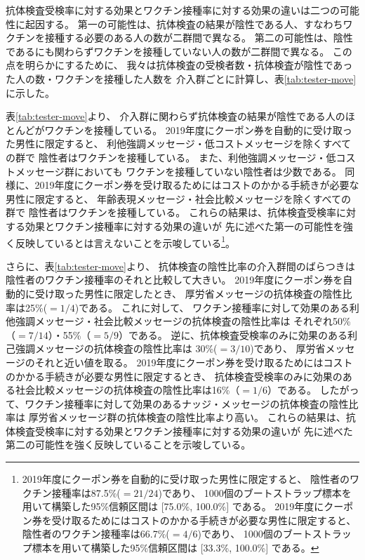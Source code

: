 \documentclass[
  11pt,
  a4paper,
]{article}
\begin{document}
抗体検査受検率に対する効果とワクチン接種率に対する効果の違いは二つの可能性に起因する。
第一の可能性は、抗体検査の結果が陰性である人、すなわちワクチンを接種する必要のある人の数が二群間で異なる。
第二の可能性は、陰性であるにも関わらずワクチンを接種していない人の数が二群間で異なる。
この点を明らかにするために、
我々は抗体検査の受検者数・抗体検査が陰性であった人の数・ワクチンを接種した人数を
介入群ごとに計算し、表\ref{tab:tester-move}に示した。

表\ref{tab:tester-move}より、
介入群に関わらず抗体検査の結果が陰性である人のほとんどがワクチンを接種している。
2019年度にクーポン券を自動的に受け取った男性に限定すると、
利他強調メッセージ・低コストメッセージを除くすべての群で
陰性者はワクチンを接種している。
また、利他強調メッセージ・低コストメッセージ群においても
ワクチンを接種していない陰性者は少数である。
同様に、2019年度にクーポン券を受け取るためにはコストのかかる手続きが必要な男性に限定すると、
年齢表現メッセージ・社会比較メッセージを除くすべての群で
陰性者はワクチンを接種している。
これらの結果は、抗体検査受検率に対する効果とワクチン接種率に対する効果の違いが
先に述べた第一の可能性を強く反映しているとは言えないことを示唆している\footnote{2019年度にクーポン券を自動的に受け取った男性に限定すると、
  陰性者のワクチン接種率は87.5\%(\(=21/24\))であり、
  1000個のブートストラップ標本を用いて構築した95\%信頼区間は
  {[}75.0\%, 100.0\%{]}
  である。
  2019年度にクーポン券を受け取るためにはコストのかかる手続きが必要な男性に限定すると、
  陰性者のワクチン接種率は66.7\%(\(=4/6\))であり、
  1000個のブートストラップ標本を用いて構築した95\%信頼区間は
  {[}33.3\%, 100.0\%{]}
  である。}。

さらに、表\ref{tab:tester-move}より、
抗体検査の陰性比率の介入群間のばらつきは陰性者のワクチン接種率のそれと比較して大きい。
2019年度にクーポン券を自動的に受け取った男性に限定したとき、
厚労省メッセージの抗体検査の陰性比率は25\%(\(=1/4\))である。
これに対して、
ワクチン接種率に対して効果のある利他強調メッセージ・社会比較メッセージの抗体検査の陰性比率は
それぞれ50\%（\(=7/14\)）・55\%（\(=5/9\)）である。
逆に、抗体検査受検率のみに効果のある利己強調メッセージの抗体検査の陰性比率は
30\%(\(=3/10\))であり、
厚労省メッセージのそれと近い値を取る。
2019年度にクーポン券を受け取るためにはコストのかかる手続きが必要な男性に限定するとき、
抗体検査受検率のみに効果のある社会比較メッセージの抗体検査の陰性比率は16\%（\(=1/6\)）である。
したがって、ワクチン接種率に対して効果のあるナッジ・メッセージの抗体検査の陰性比率は
厚労省メッセージ群の抗体検査の陰性比率より高い。
これらの結果は、抗体検査受検率に対する効果とワクチン接種率に対する効果の違いが
先に述べた第二の可能性を強く反映していることを示唆している。
\end{document}

